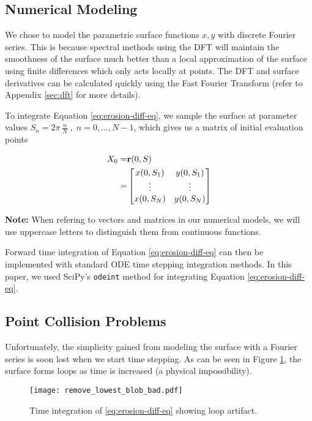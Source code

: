 \subsection*{Numerical Modeling}\label{sec:numerical-modeling}

We chose to model the parametric surface functions $x, y$ with discrete Fourier series. This is because spectral methods using the DFT will maintain the smoothness of the surface much better than a local approximation of the surface using finite differences which only acts locally at points. The DFT and surface derivatives can be calculated quickly using the Fast Fourier Transform (refer to Appendix \ref{sec:dft} for more details).

To integrate Equation \ref{eq:erosion-diff-eq}, we sample the surface at parameter values $S_n = 2 \pi \, \frac{n}{N} \; , \; n = 0, \dotsc, N-1$, which gives us a matrix of initial evaluation points

\begin{align*} 
  X_0 =& \bvec{r}\paren{0, S}\\
  =& \begin{bmatrix}
    x(0, S_1)& y(0, S_1)\\
    \vdots& \vdots\\
    x(0, S_N)& y(0, S_N)\\ 
  \end{bmatrix}
\end{align*}

\textbf{Note:} When refering to vectors and matrices in our numerical models, we will use uppercase letters to distinguish them from continuous functions.

Forward time integration of Equation \ref{eq:erosion-diff-eq} can then be implemented with standard ODE time stepping integration methods. In this paper, we used SciPy's {\tt odeint} method for integrating Equation \ref{eq:erosion-diff-eq}.

\subsection*{Point Collision Problems}

Unfortunately, the simplicity gained from modeling the surface with a Fourier series is soon lost when we start time stepping. As can be seen in Figure \ref{fig:remove-lowest-blob-bad}, the surface forms loops as time is increased (a physical impossibility).

\begin{figure}[h!]
    \begin{center}
      \texttt{[image: remove\_lowest\_blob\_bad.pdf]}
    \end{center}
  \vspace{-.2in} %
  \caption{Time integration of \ref{eq:erosion-diff-eq} showing loop artifact.\label{fig:remove-lowest-blob-bad}}
\end{figure}

